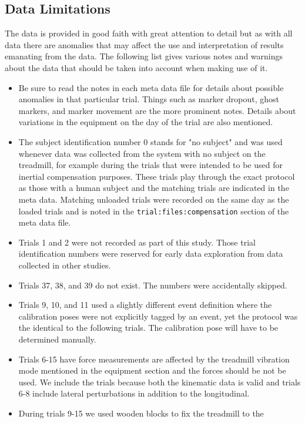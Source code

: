 \documentclass[fleqn,12pt]{wlpeerj}
\begin{document}
\subsection*{Data Limitations}
%
The data is provided in good faith with great attention to detail but as with
all data there are anomalies that may affect the use and interpretation of
results emanating from the data. The following list gives various notes and
warnings about the data that should be taken into account when making use of
it.
%
\begin{itemize}
  \item Be sure to read the notes in each meta data file for details about
    possible anomalies in that particular trial. Things such as marker dropout,
    ghost markers, and marker movement are the more prominent notes. Details
    about variations in the equipment on the day of the trial are also
    mentioned.
  \item The subject identification number 0 stands for "no subject" and was
    used whenever data was collected from the system with no subject on the
    treadmill, for example during the trials that were intended to be used for
    inertial compensation purposes. These trials play through the exact
    protocol as those with a human subject and the matching trials are
    indicated in the meta data. Matching unloaded trials were recorded on the
    same day as the loaded trials and is noted in the
    \verb|trial:files:compensation| section of the meta data file.
  \item Trials 1 and 2 were not recorded as part of this study. Those trial
    identification numbers were reserved for early data exploration from data
    collected in other studies.
  \item Trials 37, 38, and 39 do not exist. The numbers were accidentally
    skipped.
  \item Trials 9, 10, and 11 used a slightly different event definition where the
    calibration poses were not explicitly tagged by an event, yet the protocol
    was the identical to the following trials. The calibration pose will have
    to be determined manually.
  \item  Trials 6-15 have force measurements are affected by the treadmill
    vibration mode mentioned in the equipment section and the forces should be
    not be used. We include the trials because both the kinematic data is valid
    and trials 6-8 include lateral perturbations in addition to the
    longitudinal.
  \item During trials 9-15 we used wooden blocks to fix the treadmill to the

\end{itemize}
\end{document}
